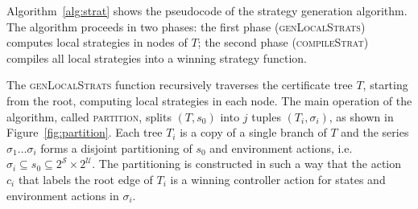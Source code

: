 Algorithm~\ref{alg:strat} shows the pseudocode of the strategy generation algorithm.  The algorithm proceeds in two phases: the first phase (\textsc{genLocalStrats}) computes local strategies in nodes of $T$; the second phase (\textsc{compileStrat}) compiles all local strategies into a winning strategy function.

The \textsc{genLocalStrats} function recursively traverses the certificate tree $T$, starting from the root, computing local strategies in each node.  The main operation of the algorithm, called \textsc{partition}, splits $(T, s_0)$ into $j$ tuples $(T_i, \sigma_i)$, as shown in Figure~\ref{fig:partition}.  Each tree $T_i$ is a copy of a single branch of $T$ and the series $\sigma_1 \ldots \sigma_i$ forms a disjoint partitioning of $s_0$ and environment actions, i.e. $\sigma_i \subseteq s_0 \subseteq 2^{\mathcal{S}} \times 2^{\mathcal{U}}$.  The partitioning is constructed in such a way that the action $c_i$ that labels the root edge of $T_i$ is a winning controller action for states and environment actions in $\sigma_i$.

